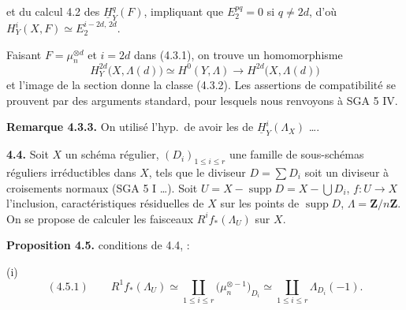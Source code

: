 \documentclass[11pt,a4paper]{article}
\begin{document}

et du calcul 4.2 des $\underline{H}^q_Y(F)$, impliquant que $E_2^{pq} = 0$ si $q \neq 2d$, d'où $H^i_Y(X, F) \simeq E_2^{i-2d,\,2d}$.

Faisant \struck{\ill{}} $F = \mu_n^{\otimes d}$ et $i = 2d$ dans (4.3.1), on trouve un homomorphisme
\[
H^{2d}_Y\bigl(X, \Lambda(d)\bigr) \simeq H^0(Y, \Lambda) \longrightarrow H^{2d}\bigl(X, \Lambda(d)\bigr)
\]
et l'image de la section   \struck{\ill{}} donne la  classe (4.3.2). Les assertions \struck{\ill{}} de compatibilité   se prouvent par des arguments standard, pour lesquels nous renvoyons à SGA 5 IV.

\textbf{Remarque 4.3.3.} On \ill{} \ill{}  utilisé l'hyp.\ de \ill{} \struck{\ill{}} avoir \ill{} les \ill{} de $\underline{H}^i_Y(\Lambda_X)$ ….


  

\textbf{4.4.} Soit $X$ un schéma régulier,  $(D_i)_{1 \leq i \leq r}$ une famille de  \struck{\ill{}} sous-schémas réguliers irréductibles dans $X$, tels que le diviseur $D = \sum D_i$ soit un diviseur à croisements normaux (SGA 5 I …). Soit $U = X - \operatorname{supp} D = X - \bigcup D_i$, $f : U \to X$ l'inclusion,  caractéristiques résiduelles de $X$ \struck{\ill{}} sur les points de  $\operatorname{supp} D$, $\Lambda = \mathbf{Z}/n\mathbf{Z}$. On se propose de calculer les faisceaux $R^i f_*(\Lambda_U)$ sur $X$. 

\textbf{Proposition 4.5.}   conditions de 4.4,   :

(i)  
\[
(4.5.1) \qquad R^1 f_*(\Lambda_U) \simeq \coprod_{1 \leq i \leq r} \bigl(\mu_n^{\otimes -1}\bigr)_{D_i} \simeq \coprod_{1 \leq i \leq r} \Lambda_{D_i}(-1) .
\]
\end{document}
